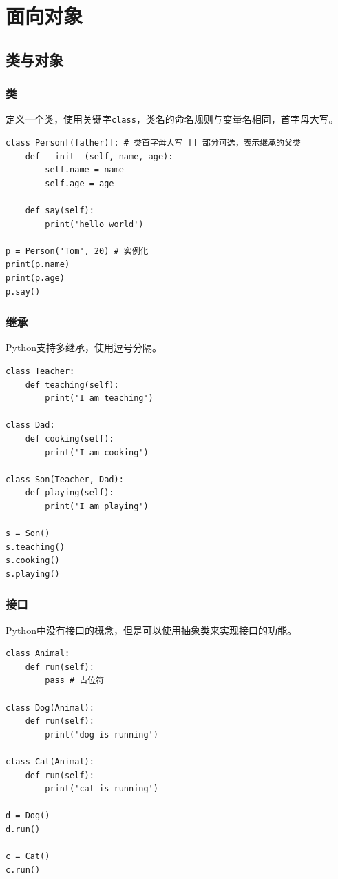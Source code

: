 \chapter{面向对象}

\section{类与对象}
\subsection{类}
定义一个类，使用关键字\texttt{class}，类名的命名规则与变量名相同，首字母大写。

\begin{lstlisting}[style=demostyle,numbers=none]
class Person[(father)]: # 类首字母大写 [] 部分可选，表示继承的父类
    def __init__(self, name, age):
        self.name = name
        self.age = age

    def say(self):
        print('hello world')

p = Person('Tom', 20) # 实例化
print(p.name)
print(p.age)
p.say()
\end{lstlisting}

\subsection{继承}
Python支持多继承，使用逗号分隔。
\begin{lstlisting}[style=demostyle,numbers=none]
class Teacher:
    def teaching(self):
        print('I am teaching')

class Dad:
    def cooking(self):
        print('I am cooking')

class Son(Teacher, Dad):
    def playing(self):
        print('I am playing')

s = Son()
s.teaching()
s.cooking()
s.playing()
\end{lstlisting}

\subsection{接口}
Python中没有接口的概念，但是可以使用抽象类来实现接口的功能。
\begin{lstlisting}[style=demostyle,numbers=none]
class Animal:
    def run(self):
        pass # 占位符

class Dog(Animal):
    def run(self):
        print('dog is running')

class Cat(Animal):
    def run(self):
        print('cat is running')

d = Dog()
d.run()

c = Cat()
c.run()
\end{lstlisting}


